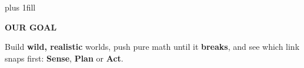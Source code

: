 \documentclass{article}
\newcommand{\bodysize}{\fontsize{27}{33.5}\selectfont}
\newlength{\colA}\setlength{\colA}{14.6in}
\newlength{\colB}\setlength{\colB}{15.5in}
\newlength{\colgap}\setlength{\colgap}{0.9in}   %
\newlength{\colH}\setlength{\colH}{23.85in}      %
\newcommand{\sectgap}{\par\vskip 0.26in plus 1fill\relax}
\begin{document}
\begin{minipage}[t][\colH][t]{\colA}
\sectgap
\begin{goalbox}
\fontsize{31}{39}\selectfont
\textcolor{ritteal}{\bfseries\faBullseye\enspace OUR GOAL}\par\vspace{0.06in}
Build \textbf{wild, realistic} worlds, push pure math until it \textbf{breaks},
and see which link snaps first:
\textcolor{ritorange}{\bfseries Sense}, \textcolor{ritorange}{\bfseries Plan} or
\textcolor{ritorange}{\bfseries Act}.
\end{goalbox}
\end{minipage}%
\hspace{\colgap}%
\begin{minipage}[t][\colH][t]{\colB}
\bodysize


\end{minipage}
\end{document}
